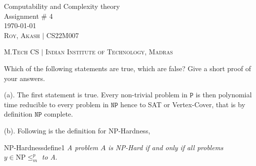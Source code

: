 \documentclass[12pt,a4, onecolumn]{exam}
\begin{document}
\begingroup  
    \centering
    \LARGE Computability and Complexity theory\\
    \LARGE Assignment \# 4\\[0.5em]
    \large \today\\[0.5em]
    \large \textsc{Roy, Akash} $\mid$ CS22M007\par
    \large \textsc{M.Tech CS} $\mid$ \textsc{Indian Institute of Technology, Madras}\par
\endgroup
\pointsdroppedatright   %
\printanswers
\renewcommand{\solutiontitle}{\noindent\textbf{Ans:}\enspace}   %

\begin{questions}

    \question Which of the following statements are true, which  are false? Give a short proof of your answers.
    
    
    \begin{solution}
        (a). The first statement is true. Every non-trivial problem in $\texttt{P}$ is then polynomial time reducible to every problem in $\texttt{NP}$ hence to SAT or Vertex-Cover, that is by definition $\texttt{NP}$ complete.

        (b). Following is the definition for NP-Hardness,

        \begin{define}{NP-Hardness}{define1}
          \textit{A problem $A$ is NP-Hard if and only if all problems $y \in \text{NP} \leq_{m} ^{p}$ to A}.
        \end{define}


\end{solution}
\end{questions}
\end{document}
